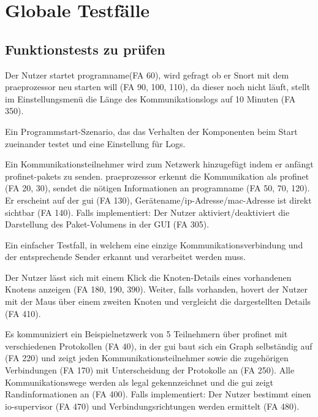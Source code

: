 \chapter{Globale Testfälle}

\section{Funktionstests zu prüfen}

\begin{description}[style=multiline, leftmargin=4cm, labelwidth=4cm]
  \item[\namedlabel{start}{Programm starten}] Der Nutzer startet \gls{programname}(FA 60), wird gefragt ob er Snort mit dem \gls{praeprozessor} neu starten will (FA 90, 100, 110), da dieser noch nicht läuft, stellt im Einstellungsmenü die Länge des Kommunikationslogs auf 10 Minuten (FA 350).
  \item[Beschreibung] Ein Programmstart-Szenario, das das Verhalten der Komponenten beim Start zueinander testet und eine Einstellung für Logs.
  \item[\namedlabel{addNetNode}{Kommunikationsteilnehmer hinzufügen}] Ein Kommunikationsteilnehmer wird zum Netzwerk hinzugefügt indem er anfängt \gls{profinet}-\glspl{paket} zu senden. \gls{praeprozessor} erkennt die Kommunikation als \gls{profinet} (FA 20, 30), sendet die nötigen Informationen an \gls{programname} (FA 50, 70, 120). Er erscheint auf der \gls{gui} (FA 130), Gerätename/\gls{ip}-Adresse/\gls{mac}-Adresse ist direkt sichtbar (FA 140). Falls implementiert: Der Nutzer aktiviert/deaktiviert die Darstellung des Paket-Volumens in der GUI (FA 305).
  \item[Beschreibung] Ein einfacher Testfall, in welchem eine einzige Kommunikationsverbindung und der entsprechende Sender erkannt und verarbeitet werden muss.
  \item[\namedlabel{infobox}{Details anzeigen}] Der Nutzer lässt sich mit einem Klick die Knoten-Details eines vorhandenen Knotens anzeigen (FA 180, 190, 390). Weiter, falls vorhanden, hovert der Nutzer mit der Maus über einem zweiten Knoten und vergleicht die dargestellten Details (FA 410).
  \item[\namedlabel{normalWatch}{Normale Netzwerküberwachung}] Es kommuniziert ein Beispielnetzwerk von 5 Teilnehmern über \gls{profinet} mit verschiedenen Protokollen (FA 40), in der \gls{gui} baut sich ein Graph selbständig auf (FA 220) und zeigt jeden Kommunikationsteilnehmer sowie die zugehörigen Verbindungen (FA 170) mit Unterscheidung der Protokolle an (FA 250). Alle Kommunikationswege werden als legal gekennzeichnet und die \gls{gui} zeigt Randinformationen an (FA 400). Falls implementiert: Der Nutzer bestimmt einen \gls{io-supervisor} (FA 470) und Verbindungsrichtungen werden ermittelt (FA 480).

\end{description}
